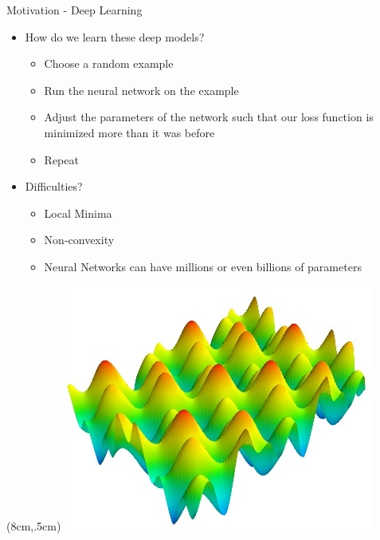 \documentclass{beamer}
\begin{document}
\begin{frame}{Motivation - Deep Learning}
\begin{itemize}
\item How do we learn these deep models?
\begin{itemize}
\item Choose a random example
\item Run the neural network on the example
\item Adjust the parameters of the network such that our loss function is minimized more than it was before
\item Repeat
\end{itemize}
\pause
\item Difficulties?
\begin{itemize}
\item Local Minima
\item Non-convexity
\item Neural Networks can have millions or even billions of parameters
\end{itemize}
\end{itemize}
\begin{textblock*}{5cm}(8cm,.5cm) %
\includegraphics[scale = .3]{./img/2d_func}
\end{textblock*}
\end{frame}
\end{document}
